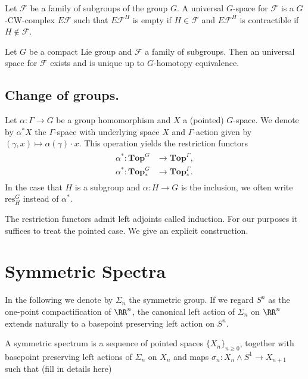 \begin{mydef}
Let $\mathcal{F}$ be a family of subgroups of the group $G$. A universal $G$-space
for $\mathcal{F}$ is a $G$-CW-complex $E\mathcal{F}$ such that $E\mathcal{F}^H$
is empty if $H\in \mathcal{F}$ and $E\mathcal{F}^H$
is contractible if $H\not \in \mathcal{F}$.
\end{mydef}

\begin{thm}
Let $G$ be a compact Lie group and $\mathcal{F}$ a family of subgroups.
Then an universal space for $\mathcal{F}$ exists and is unique up to
$G$-homotopy equivalence.
\end{thm}

\subsection{Change of groups.}
\begin{mydef}
Let $\alpha:\Gamma\to G$ be a group homomorphism and $X$ a (pointed) $G$-space.
We denote by $\alpha^\ast X$ the $\Gamma$-space with underlying space $X$
and $\Gamma$-action given by $(\gamma,x)\mapsto \alpha(\gamma)\cdot x$. This operation 
yields the restriction functors
\begin{align}
\begin{split}
\alpha^\ast:\mathbf{Top}^G&\to \mathbf{Top}^{\Gamma},\\
\alpha^\ast: \mathbf{Top}^G_\ast&\to \mathbf{Top}^{\Gamma}_\ast.
\end{split}
\end{align}
In the case that $H$ is a subgroup and $\alpha:H\to G$ is the inclusion, we often
write $\mathrm{res}^G_H$ instead of $\alpha^\ast$.
\end{mydef}
The restriction functors admit left adjoints called induction. For our purposes
it suffices to treat the pointed case. We give an explicit construction.

\begin{mydef}

\end{mydef}
\section{Symmetric Spectra}

In the following we denote by $\Sigma_n$ the symmetric group. If we regard $S^{n}$ as the one-point compactification
of $\RR^n$, the canonical left action of $\Sigma_n$ on $\RR^n$ extends naturally to a basepoint preserving left action
on $S^{n}$.
\begin{mydef}
A symmetric spectrum is a sequence of pointed spaces $\{X_n\}_{n\ge 0}$, together with basepoint preserving left actions
of $\Sigma_n$ on $X_n$ and maps $\sigma_n:X_n\wedge S^1\rightarrow X_{n+1}$ such that (fill in details here)
\end{mydef}

